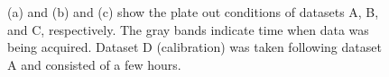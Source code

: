 \begin{figure}[hbtp]
\centering
{}\\
\\
\caption{(a) and (b) and (c) show the plate out conditions of datasets A, B, and C, respectively. The gray bands indicate time when data was being acquired. Dataset D (calibration) was taken following dataset A and consisted of a few hours.}
\label{fig:plate_out}
\end{figure}


